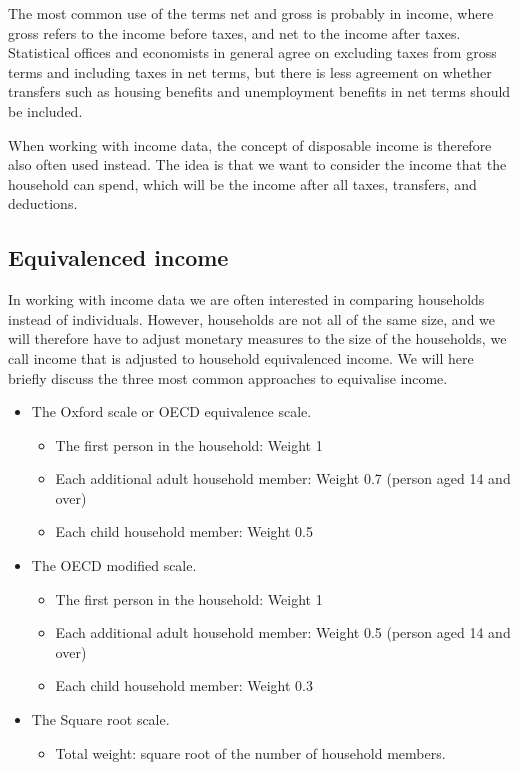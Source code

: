 \documentclass[]{book}
\providecommand{\tightlist}{%
  \setlength{\itemsep}{0pt}\setlength{\parskip}{0pt}}
\begin{document}
The most common use of the terms net and gross is probably in income, where gross refers to the income before taxes, and net to the income after taxes. Statistical offices and economists in general agree on excluding taxes from gross terms and including taxes in net terms, but there is less agreement on whether transfers such as housing benefits and unemployment benefits in net terms should be included.

When working with income data, the concept of disposable income is therefore also often used instead. The idea is that we want to consider the income that the household can spend, which will be the income after all taxes, transfers, and deductions.

\hypertarget{equivalenced-income}{%
\subsection{Equivalenced income}\label{equivalenced-income}}

In working with income data we are often interested in comparing households instead of individuals. However, households are not all of the same size, and we will therefore have to adjust monetary measures to the size of the households, we call income that is adjusted to household equivalenced income. We will here briefly discuss the three most common approaches to equivalise income.

\begin{itemize}
\item
  The Oxford scale or OECD equivalence scale.

  \begin{itemize}
  \tightlist
  \item
    The first person in the household: Weight 1
  \item
    Each additional adult household member: Weight 0.7 (person aged 14 and over)
  \item
    Each child household member: Weight 0.5
  \end{itemize}
\item
  The OECD modified scale.

  \begin{itemize}
  \tightlist
  \item
    The first person in the household: Weight 1
  \item
    Each additional adult household member: Weight 0.5 (person aged 14 and over)
  \item
    Each child household member: Weight 0.3
  \end{itemize}
\item
  The Square root scale.

  \begin{itemize}
  \tightlist
  \item
    Total weight: square root of the number of household members.
  \end{itemize}
\end{itemize}
\end{document}
